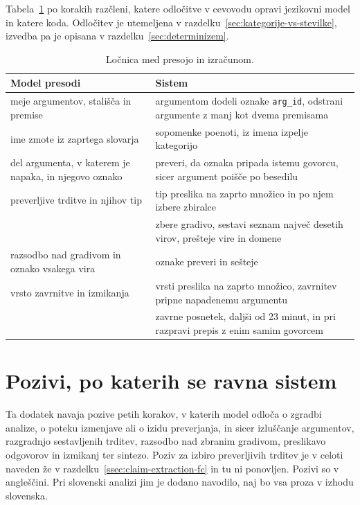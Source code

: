 \documentclass[a4paper, 12pt]{book}
\begin{document}
Tabela~\ref{tbl:locnica} po korakih razčleni, katere odločitve v cevovodu opravi
jezikovni model in katere koda. Odločitev je utemeljena v
razdelku~\ref{sec:kategorije-vs-stevilke}, izvedba pa je opisana v
razdelku~\ref{sec:determinizem}.

\begin{table}[htbp]
\centering
\small
{}
\begin{tabular}{@{}p{} | p{}@{}}
\toprule
Model presodi & Sistem \\
\midrule
meje argumentov, stališča in premise & argumentom dodeli oznake \texttt{arg\_id}, odstrani argumente z manj kot dvema premisama \\
\midrule
ime zmote iz zaprtega slovarja & sopomenke poenoti, iz imena izpelje kategorijo \\
\midrule
del argumenta, v katerem je napaka, in njegovo oznako & preveri, da oznaka pripada istemu govorcu, sicer argument poišče po besedilu \\
\midrule
preverljive trditve in njihov tip & tip preslika na zaprto množico in po njem izbere zbiralce \\
\midrule
 & zbere gradivo, sestavi seznam največ desetih virov, prešteje vire in domene \\
\midrule
razsodbo nad gradivom in oznako vsakega vira & oznake preveri in sešteje \\
\midrule
vrsto zavrnitve in izmikanja & vrsti preslika na zaprto množico, zavrnitev pripne napadenemu argumentu \\
\midrule
 & zavrne posnetek, daljši od 23 minut, in pri razpravi prepis z enim samim govorcem \\
\bottomrule
\end{tabular}
\caption{Ločnica med presojo in izračunom.}
\label{tbl:locnica}
\end{table}


\chapter{Pozivi, po katerih se ravna sistem}
\label{app:pozivi}

Ta dodatek navaja pozive petih korakov, v katerih model odloča o zgradbi
analize, o poteku izmenjave ali o izidu preverjanja, in sicer izluščanje
argumentov, razgradnjo sestavljenih trditev, razsodbo nad zbranim gradivom,
preslikavo odgovorov in izmikanj ter sintezo. Poziv za izbiro preverljivih trditev je v celoti naveden že v
razdelku~\ref{ssec:claim-extraction-fc} in tu ni ponovljen. Pozivi so v
angleščini. Pri slovenski analizi jim je dodano navodilo, naj bo vsa proza v
izhodu slovenska.
\end{document}
